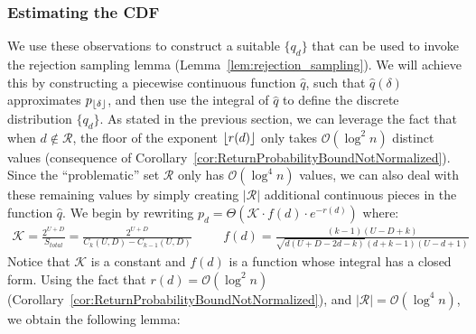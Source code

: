 \subsubsection{Estimating the CDF}
\label{sec:estimating_the_cdf}
We use these observations to construct a suitable $\{q_d\}$ that can be used to invoke the rejection sampling lemma (Lemma~\ref{lem:rejection_sampling}).
We will achieve this by constructing a piecewise continuous function $\hat q$,
such that $\hat q(\delta)$ approximates $p_{\lfloor\delta\rfloor}$, and then use the integral of $\hat q$ to define the discrete distribution $\{q_d\}$.
As stated in the previous section, we can leverage the fact that when $d \not \in \mathcal R$,
the floor of the exponent $\lfloor r(d)\rfloor$ only takes $\mathcal O(\log^2 n)$ distinct values
(consequence of Corollary~\ref{cor:ReturnProbabilityBoundNotNormalized}).
Since the ``problematic'' set $\mathcal R$ only has $\mathcal O(\log^4 n)$ values,
we can also deal with these remaining values by simply creating $|\mathcal R|$ additional continuous pieces in the function $\hat q$.
We begin by rewriting $p_d = \Theta\left(\mathcal K \cdot f(d)\cdot e^{-r(d)}\right)$ where:
{\small
    \begin{align}
    \label{eq:dyck_integrable_function}
        \mathcal K = \frac{2^{U+D}}{S_{total}} = \frac{2^{U+D}}{C_k(U,D)-C_{k-1}(U,D)}\ \ \ \
        &&f(d) = \frac{(k-1)(U-D+k)}{\sqrt{d(U+D-2d-k)}(d+k-1)(U-d+1)}
    \end{align}}
Notice that $\mathcal K$ is a constant and $f(d)$ is a function whose integral has a closed form.
Using the fact that $r(d) = \mathcal O(\log^2 n)$ (Corollary~\ref{cor:ReturnProbabilityBoundNotNormalized}),
and $|\mathcal R| = \mathcal O(\log^4 n)$, we obtain the following lemma:


